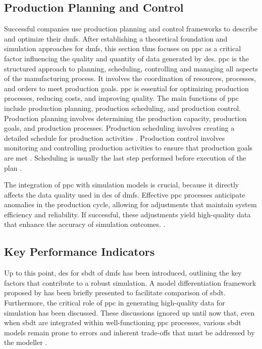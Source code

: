 \subsection{Production Planning and Control}
\label{sec:ppc}
Successful companies use production planning and control frameworks to describe and optimize their \gls{dmfs}. After establishing a theoretical foundation and simulation approaches for \gls{dmfs}, this section thus focuses on \gls{ppc} as a critical factor influencing the quality and quantity of data generated by \gls{des}.
\gls{ppc} is the structured approach to planning, scheduling, controlling and managing all aspects of the manufacturing process. It involves the coordination of resources, processes, and orders to meet production goals. \gls{ppc} is essential for optimizing production processes, reducing costs, and improving quality. The main functions of \gls{ppc} include production planning, production scheduling, and production control. Production planning involves determining the production capacity, production goals, and production processes. Production scheduling involves creating a detailed schedule for production activities \autocite{kasper2024designing}. Production control involves monitoring and controlling production activities to ensure that production goals are met \autocite{kiran2019production}. Scheduling is usually the last step performed before execution of the plan \autocite{pinedo2012design}.

The integration of \gls{ppc} with simulation models is crucial, because it directly affects the data quality used in \gls{des} of \gls{dmfs}. Effective \gls{ppc} processes anticipate anomalies in the production cycle, allowing for adjustments that maintain system efficiency and reliability. If successful, these adjustments yield high-quality data that enhance the accuracy of simulation outcomes. \autocite{kiran2019production}.


\subsection{Key Performance Indicators}
\label{sec:relevant-kpis}
Up to this point, \gls{des} for \gls{sbdt} of \gls{dmfs} has been introduced, outlining the key factors that contribute to a robust simulation. A model differentiation framework proposed by \textcite*{Schwede2024} has been briefly presented to facilitate comparison of \gls{sbdt}. Furthermore, the critical role of \gls{ppc} in generating high-quality data for simulation has been discussed. These discussions ignored up until now that, even when \gls{sbdt} are integrated within well-functioning \gls{ppc} processes, various \gls{sbdt} models remain prone to errors and inherent trade-offs that must be addressed by the modeller \autocite{Tao2018ijamt}.

